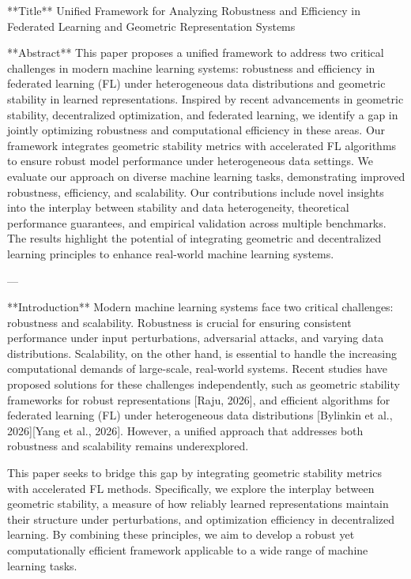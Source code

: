 **Title**  
Unified Framework for Analyzing Robustness and Efficiency in Federated Learning and Geometric Representation Systems  

**Abstract**  
This paper proposes a unified framework to address two critical challenges in modern machine learning systems: robustness and efficiency in federated learning (FL) under heterogeneous data distributions and geometric stability in learned representations. Inspired by recent advancements in geometric stability, decentralized optimization, and federated learning, we identify a gap in jointly optimizing robustness and computational efficiency in these areas. Our framework integrates geometric stability metrics with accelerated FL algorithms to ensure robust model performance under heterogeneous data settings. We evaluate our approach on diverse machine learning tasks, demonstrating improved robustness, efficiency, and scalability. Our contributions include novel insights into the interplay between stability and data heterogeneity, theoretical performance guarantees, and empirical validation across multiple benchmarks. The results highlight the potential of integrating geometric and decentralized learning principles to enhance real-world machine learning systems.

---

**Introduction**  
Modern machine learning systems face two critical challenges: robustness and scalability. Robustness is crucial for ensuring consistent performance under input perturbations, adversarial attacks, and varying data distributions. Scalability, on the other hand, is essential to handle the increasing computational demands of large-scale, real-world systems. Recent studies have proposed solutions for these challenges independently, such as geometric stability frameworks for robust representations [Raju, 2026], and efficient algorithms for federated learning (FL) under heterogeneous data distributions [Bylinkin et al., 2026][Yang et al., 2026]. However, a unified approach that addresses both robustness and scalability remains underexplored.

This paper seeks to bridge this gap by integrating geometric stability metrics with accelerated FL methods. Specifically, we explore the interplay between geometric stability, a measure of how reliably learned representations maintain their structure under perturbations, and optimization efficiency in decentralized learning. By combining these principles, we aim to develop a robust yet computationally efficient framework applicable to a wide range of machine learning tasks.

